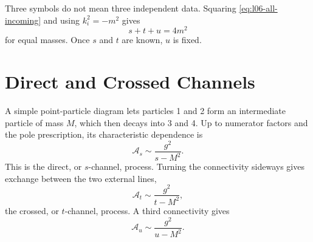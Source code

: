 Three symbols do not mean three independent data. Squaring
\eqref{eq:l06-all-incoming} and using \(k_i^2=-m^2\) gives
\begin{equation}
  s+t+u=4m^2
  \label{eq:l06-stu-constraint}
\end{equation}
for equal masses. Once \(s\) and \(t\) are known, \(u\) is fixed.

\begin{classroomqa}
\end{classroomqa}

\begin{classroomqa}
\end{classroomqa}

\section{Direct and Crossed Channels}

A simple point-particle diagram lets particles 1 and 2 form an intermediate
particle of mass \(M\), which then decays into 3 and 4. Up to numerator
factors and the pole prescription, its characteristic dependence is
\begin{equation}
  \mathcal A_s\sim\frac{g^2}{s-M^2}.
  \label{eq:l06-s-channel}
\end{equation}
This is the direct, or \(s\)-channel, process. Turning the connectivity
sideways gives exchange between the two external lines,
\begin{equation}
  \mathcal A_t\sim\frac{g^2}{t-M^2},
  \label{eq:l06-t-channel}
\end{equation}
the crossed, or \(t\)-channel, process. A third connectivity gives
\begin{equation}
  \mathcal A_u\sim\frac{g^2}{u-M^2}.
  \label{eq:l06-u-channel}
\end{equation}

